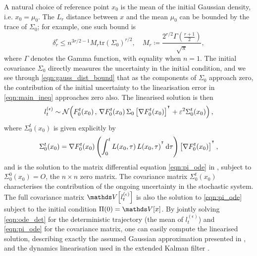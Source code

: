 A natural choice of reference point \(x_0\) is the mean of the initial Gaussian density, i.e. \(x_0 = \mu_0\).
The \(L_r\) distance between \(x\) and the mean \(\mu_0\) can be bounded by the trace of \(\Sigma_0\); for example, one such bound is
\begin{equation}\label{eqn:gauss_dist_bound}
	\delta_r^{r} \leq n^{3r/2 - 1} M_r \mathrm{tr}\left(\Sigma_0\right)^{r/2}, \quad M_r \coloneqq \frac{2^{r/2}\Gamma\!\left(\frac{r + 1}{2}\right)}{\sqrt{\pi}},
\end{equation}
where \(\Gamma\) denotes the Gamma function, with equality when \(n = 1\).
The initial covariance \(\Sigma_0\) directly measures the uncertainty in the initial condition, and we see through \cref{eqn:gauss_dist_bound} that as the components of \(\Sigma_0\) approach zero, the contribution of the initial uncertainty to the linearisation error in \cref{eqn:main_ineq} approaches zero also.
The linearised solution is then
\[
	l_t^{(\epsilon)} \sim\mathcal{N}\!\left(F_0^t\!\left(x_0\right), \, \nabla F_0^t\!\left(x_0\right) \Sigma_0\left[\nabla F_0^t\!\left(x_0\right)\right]^{^{\intercal}} + \varepsilon^2 \Sigma_0^t\!\left(x_0\right)\right),
\]
where \(\Sigma_0^t\!\left(x_0\right)\) is given explicitly by
\begin{equation}\label{eqn:sigma_def}
	\Sigma_0^t\!\left(x_0\right) = \nabla F_0^t\!\left(x_0\right)\left(\int_0^t{L\!\left(x_0, \tau\right)L\!\left(x_0, \tau\right)^{\T} \dif\tau}\right)\left[\nabla F_0^t\!\left(x_0\right)\right]^{\T},
\end{equation}
and is the solution to the matrix differential equation \cref{eqn:pi_ode} in , subject to \(\Sigma_0^0\!\left(x_0\right) = O\), the \(n \times n\) zero matrix.
The covariance matrix \(\Sigma_0^t\!\left(x_0\right)\) characterises the contribution of the ongoing uncertainty in the stochastic system.
The full covariance matrix \(\var{l_t^{(\epsilon)}}\) is also the solution to \cref{eqn:pi_ode} subject to the initial condition \(\Pi(0) = \var{x}\).
By jointly solving \cref{eqn:ode_det} for the deterministic trajectory (the mean of \(l_t^{(\epsilon)}\)) and \cref{eqn:pi_ode} for the covariance matrix, one can easily compute the linearised solution, describing exactly the assumed Gaussian approximation presented in \citet{SarkkaSolin_2019_AppliedStochasticDifferential}, and the dynamics linearisation used in the extended Kalman filter \cite{Jazwinski_2014_StochasticProcessesFiltering}.


